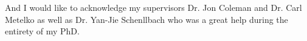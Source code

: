 
\begin{acknowledgements}      


And I would like to acknowledge my supervisors Dr. Jon Coleman and Dr. Carl Metelko as well as Dr. Yan-Jie Schenllbach who was a great help during the entirety of my PhD. 


\end{acknowledgements}
